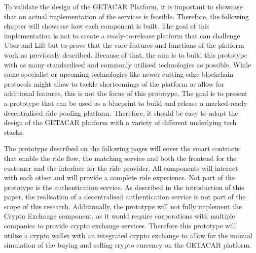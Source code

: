 To validate the design of the GETACAR Platform, it is important to showcase that an actual implementation of the services is feasible. Therefore, the following chapter will showcase how each component is built. The goal of this implementation is not to create a ready-to-release platform that can challenge Uber and Lift but to prove that the core features and functions of the platform work as previously described. Because of that, the aim is to build this prototype with as many standardised and commonly utilised technologies as possible. While some specialist or upcoming technologies like newer cutting-edge blockchain protocols might allow to tackle shortcomings of the platform or allow for additional features, this is not the focus of this prototype. The goal is to present a prototype that can be used as a blueprint to build and release a marked-ready decentralised ride-pooling platform. Therefore, it should be easy to adapt the design of the GETACAR platform with a variety of different underlying tech stacks.

The prototype described on the following pages will cover the smart contracts that enable the ride flow, the matching service and both the frontend for the customer and the interface for the ride provider. All components will interact with each other and will provide a complete ride experience. Not part of the prototype is the authentication service. As described in the introduction of this paper, the realisation of a decentralised authentication service is not part of the scope of this research. Additionally, the prototype will not fully implement the Crypto Exchange component, as it would require corporations with multiple companies to provide crypto exchange services. Therefore this prototype will utilise a crypto wallet with an integrated crypto exchange to allow for the manual simulation of the buying and selling crypto currency on the GETACAR platform.
